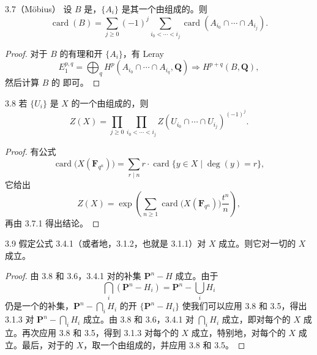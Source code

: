 \begin{SGAresult}{}{3.7（Möbius）}
设 $B$ 是，$\{A_i\}$ 是其一个由组成的。则
\[
\operatorname{card}(B)=\sum_{j\geq0}(-1)^j
\sum_{i_0<\cdots<i_j}\operatorname{card}(A_{i_0}\cap\cdots\cap A_{i_j}). \tag{3.7.1}
\]
\end{SGAresult}
\begin{proof}
对于 $B$ 的有理和开 $\{A_i\}$，有 Leray 
\[
E_1^{p,q}=\bigoplus_q H^p(A_{i_0}\cap\cdots\cap A_{i_q},\mathbf Q)
\Longrightarrow H^{p+q}(B,\mathbf Q),
\]
然后计算 $B$ 的 即可。
\end{proof}
\begin{SGAresult}{}{3.8}
若 $\{U_i\}$ 是 $X$ 的一个由组成的，则
\[
Z(X)=\prod_{j\geq0}\prod_{i_0<\cdots<i_j}
Z(U_{i_0}\cap\cdots\cap U_{i_j})^{(-1)^j}. \tag{3.8.1}
\]
\end{SGAresult}
\begin{proof}
有公式
\[
\operatorname{card}\bigl(X(\mathbf F_{q^n})\bigr)
=\sum_{r\mid n}r\cdot\operatorname{card}\{y\in X\mid\deg(y)=r\}, \tag{3.8.2}
\]
它给出
\[
Z(X)=\exp\left(\sum_{n\geq1}\operatorname{card}\bigl(X(\mathbf F_{q^n})\bigr)
\frac{t^n}{n}\right), \tag{3.8.3}
\]
再由 3.7.1 得出结论。
\end{proof}
\begin{SGAresult}{}{3.9}
假定公式 3.4.1（或者地，3.1.2，也就是 3.1.1）对 $X$ 成立。则它对一切的 $X$ 成立。
\end{SGAresult}
\begin{proof}
由 3.8 和 3.6，3.4.1 对的补集 $\mathbf P^n-H$ 成立。由于
\[
\bigcap_i(\mathbf P^n-H_i)=\mathbf P^n-\bigcup_iH_i
\]
仍是一个的补集，$\mathbf P^n-\bigcap_iH_i$ 的开 $\{\mathbf P^n-H_i\}$ 使我们可以应用 3.8 和 3.5，得出 3.1.3 对 $\mathbf P^n-\bigcap_iH_i$ 成立。由 3.8 和 3.6，3.4.1 对 $\bigcap_iH_i$ 成立，即对每个的 $X$ 成立。再次应用 3.8 和 3.5，得到 3.1.3 对每个的 $X$ 成立，特别地，对每个的 $X$ 成立。最后，对于的 $X$，取一个由组成的，并应用 3.8 和 3.5。
\end{proof}

